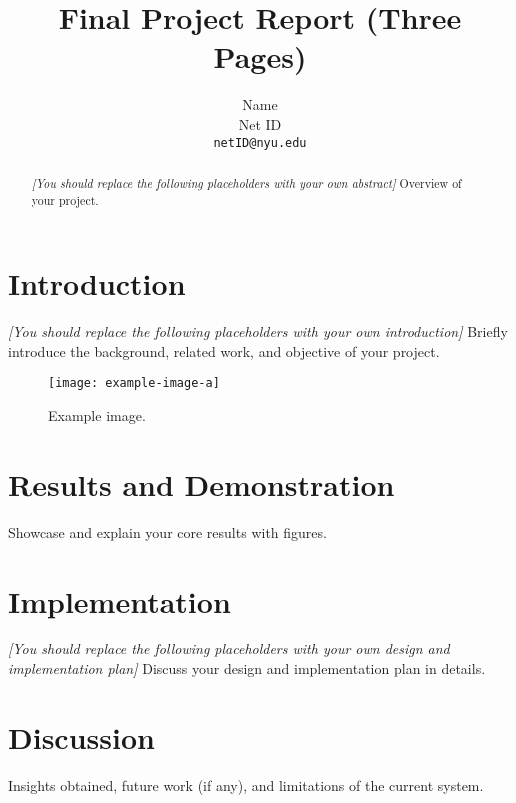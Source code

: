 \documentclass[10pt,twocolumn,letterpaper]{article}
\newcommand{\note}[1]{{\it\color{red} #1}}
\begin{document}
\title{Final Project Report (Three Pages)}
\author{Name\\Net ID\\{\tt\small netID@nyu.edu}}
\maketitle


\begin{abstract}

\note{[You should replace the following placeholders with your own abstract]}
Overview of your project. 

\end{abstract}


\section{Introduction}
\label{sec:introduction}

\note{[You should replace the following placeholders with your own introduction]}
Briefly introduce the background, related work, and objective of your project. 


\begin{figure}[!t]
  \centering
  \texttt{[image: example-image-a]}
  \caption{Example image.}
  \label{fig:example}
\end{figure}


\section{Results and Demonstration}
\label{sec:results}
Showcase and explain your core results with figures.

\section{Implementation}
\label{sec:design}

\note{[You should replace the following placeholders with your own design and implementation plan]}
Discuss your design and implementation plan in details. 


\section{Discussion}
\label{sec:evaluation}
Insights obtained, future work (if any), and limitations of the current system.


{\small


}
\end{document}
